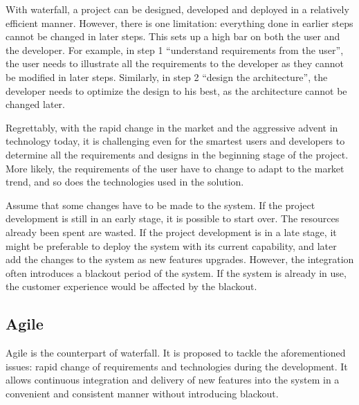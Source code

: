 With waterfall, a project can be designed, developed and deployed in a relatively efficient manner. However, there is one limitation: everything done in earlier steps cannot be changed in later steps. This sets up a high bar on both the user and the developer. For example, in step 1 ``understand requirements from the user'', the user needs to illustrate all the requirements to the developer as they cannot be modified in later steps. Similarly, in step 2 ``design the architecture'', the developer needs to optimize the design to his best, as the architecture cannot be changed later.

Regrettably, with the rapid change in the market and the aggressive advent in technology today, it is challenging even for the smartest users and developers to determine all the requirements and designs in the beginning stage of the project. More likely, the requirements of the user have to change to adapt to the market trend, and so does the technologies used in the solution.

Assume that some changes have to be made to the system. If the project development is still in an early stage, it is possible to start over. The resources already been spent are wasted. If the project development is in a late stage, it might be preferable to deploy the system with its current capability, and later add the changes to the system as new features upgrades. However, the integration often introduces a blackout period of the system. If the system is already in use, the customer experience would be affected by the blackout.

\subsection{Agile}

Agile is the counterpart of waterfall. It is proposed to tackle the aforementioned issues: rapid change of requirements and technologies during the development. It allows continuous integration and delivery of new features into the system in a convenient and consistent manner without introducing blackout.

